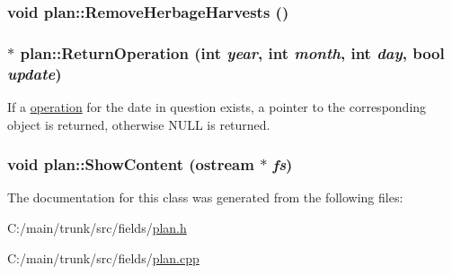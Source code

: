 \label{classplan_ad3c70afeed1b7ed1d00046ebbe3db961}
\hypertarget{classplan_a8a7b5b42e4b3ff4a705390733b2e38e2}{
\subsubsection[{RemoveHerbageHarvests}]{\setlength{\rightskip}{0pt plus 5cm}void plan::RemoveHerbageHarvests ()}}
\label{classplan_a8a7b5b42e4b3ff4a705390733b2e38e2}
\hypertarget{classplan_a5bb316264b932ad51c4af2441691b61d}{
\subsubsection[{ReturnOperation}]{ $\ast$ plan::ReturnOperation (int {\em year}, \/  int {\em month}, \/  int {\em day}, \/  bool {\em update})}}
\label{classplan_a5bb316264b932ad51c4af2441691b61d}
If a \hyperlink{classoperation}{operation} for the date in question exists, a pointer to the corresponding object is returned, otherwise NULL is returned. \hypertarget{classplan_aa904d6cb1887fb97f8e4a10fc13df74b}{
\subsubsection[{ShowContent}]{\setlength{\rightskip}{0pt plus 5cm}void plan::ShowContent (ostream $\ast$ {\em fs})}}
\label{classplan_aa904d6cb1887fb97f8e4a10fc13df74b}


The documentation for this class was generated from the following files:\begin{DoxyCompactItemize}
\item 
C:/main/trunk/src/fields/\hyperlink{plan_8h}{plan.h}\item 
C:/main/trunk/src/fields/\hyperlink{plan_8cpp}{plan.cpp}\end{DoxyCompactItemize}
